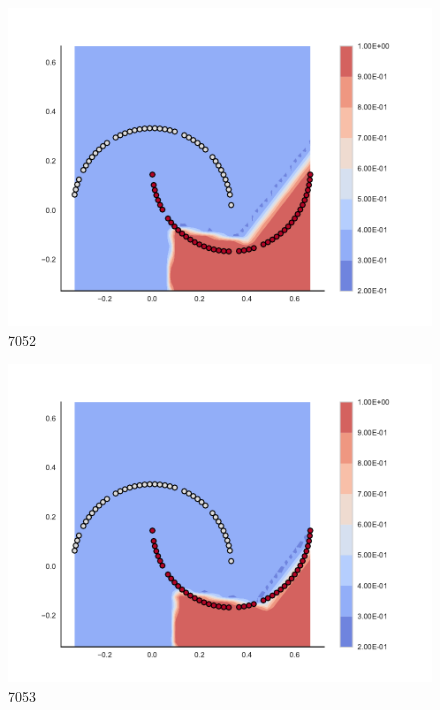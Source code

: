 \begin{subfigure}[b]{0.09\textwidth}
    \includegraphics[clip, trim=2.35cm 1.75cm 4.5cm 0cm,width=\textwidth]{img/convergence/7052.pdf}
    \caption{7052}
    \label{fig:convergence_7052}
\end{subfigure}
%
\begin{subfigure}[b]{0.09\textwidth}
    \includegraphics[clip, trim=2.35cm 1.75cm 4.5cm 0cm,width=\textwidth]{img/convergence/7053.pdf}
    \caption{7053}
    \label{fig:convergence_7053}
\end{subfigure}
%
